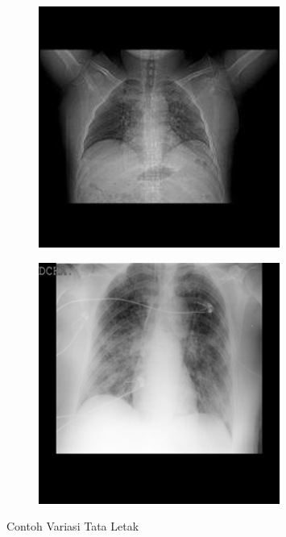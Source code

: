 \begin{figure}
\centering
\begin{subfigure}{.5\textwidth}
  \centering
  \includegraphics[width=.6\linewidth]{pics/COVID-481.png}
\end{subfigure}%
\begin{subfigure}{.5\textwidth}
  \centering
  \includegraphics[width=.6\linewidth]{pics/COVID-950.png}
\end{subfigure}%
\caption{Contoh Variasi Tata Letak}
\label{var tata letak}
\end{figure}


